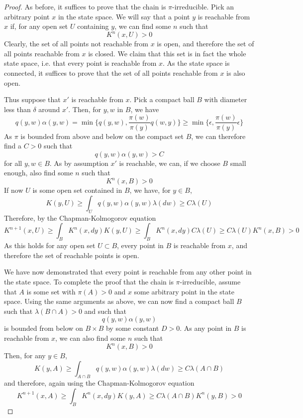 \documentclass[a4paper, draft]{article}
\theoremstyle{own}
\theoremstyle{remark}
\begin{document}
\begin{proof}
	As before, it suffices to prove that the chain is $\pi$-irreducible. Pick an arbitrary point $x$ in the state space. We will say that a point $y$ is reachable from $x$ if, for any open set $U$ containing $y$, we can find some $n$ such that
	$$
	K^n(x,U) > 0
	$$
	Clearly, the set of all points not reachable from $x$ is open, and therefore the set of all points reachable from $x$ is closed. We claim that this set is in fact the whole state space, i.e. that every point is reachable from $x$. As the state space is connected, it suffices to prove that the set of all points reachable from $x$ is also open.
	
	Thus suppose that $x'$ is reachable from $x$. Pick a compact ball $B$ with diameter less than $\delta$ around $x'$. Then, for $y,w$ in $B$, we have
	$$
	q(y,w) \alpha(y,w) = \min \{  q(y,w), \frac{\pi(w)}{\pi(y)} q(w,y) \}
	\geq \min \{  \epsilon, \frac{\pi(w)}{\pi(y)} \epsilon \}
	$$ 
	As $\pi$ is bounded from above and below on the compact set $B$, we can therefore find a $C > 0$ such that
	$$
	q(y,w) \alpha(y,w) > C
	$$
	for all $y,w \in B$. As by assumption $x'$ is reachable, we can, if we choose $B$ small enough, also find some $n$ such that
	$$
	K^n(x,B) > 0
	$$
	If now $U$ is some open set contained in $B$, we have, for $y \in B$,
	$$
	K(y, U) \geq \int_U q(y,w) \alpha(y,w) \lambda(dw) \geq C \lambda(U)
	$$
	Therefore, by the Chapman-Kolmogorov equation
	$$
	K^{n+1}(x,U) \geq \int_B K^n(x,dy) K(y,U) \geq \int_B K^n(x,dy) C \lambda(U)
	\geq C \lambda(U) K^n(x,B) > 0
	$$
	As this holds for any open set $U \subset B$, every point in $B$ is reachable from $x$, and therefore the set of reachable points is open.
	
	We have now demonstrated that every point is reachable from any other point in the state space. To complete the proof that the chain is $\pi$-irreducible, assume that $A$ is some set with $\pi(A) > 0$ and $x$ some arbitrary point in the state space. Using the same arguments as above, we can now find a compact ball $B$ such that
	$\lambda(B \cap A) > 0$ and such that
	$$
	q(y,w)\alpha(y,w)
	$$
	is bounded from below on $B \times B$ by some constant $D > 0$. As any point in $B$ is reachable from $x$, we can also find some $n$ such that 
	$$
	K^n(x,B) > 0
	$$
	Then, for any $y \in B$,
	$$
	K(y,A) \geq \int_{A \cap B} q(y,w) \alpha(y,w) \lambda(dw) \geq C \lambda(A \cap B)
	$$
	and therefore, again using the Chapman-Kolmogorov equation
	$$
	K^{n+1}(x,A) \geq \int_B K^n(x,dy) K(y,A) \geq C \lambda(A \cap B) K^n(y,B) > 0
	$$
\end{proof}
\end{document}
